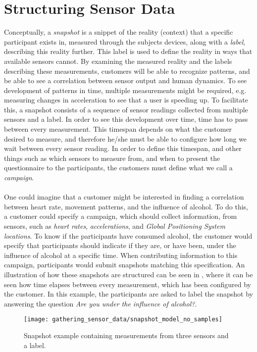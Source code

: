 
\section{Structuring Sensor Data}
\label{sec:modeling_sensor_data}


Conceptually, a \emph{snapshot} is a snippet of the reality (context) that a specific participant exists in, measured through the subjects devices, along with a \emph{label}, describing this reality further. This label is used to define the reality in ways that available sensors cannot. By examining the measured reality and the labels describing these measurements, customers will be able to recognize patterns, and be able to see a correlation between sensor output and human dynamics. To see development of patterns in time, multiple measurements might be required, e.g. measuring changes in acceleration to see that a user is speeding up. To facilitate this, a snapshot consists of a sequence of sensor readings collected from multiple sensors and a label. In order to see this development over time, time has to pass between every measurement. This timespan depends on what the customer desired to measure, and therefore he/she must be able to configure how long we wait between every sensor reading. In order to define this timespan, and other things such as which sensors to measure from, and when to present the questionnaire to the participants, the customers must define what we call a \emph{campaign}.
\\\\
One could imagine that a customer might be interested in finding a correlation between heart rate, movement patterns, and the influence of alcohol. To do this, a customer could specify a campaign, which should collect information, from sensors, such as \emph{heart rates}, \emph{accelerations}, and \emph{Global Positioning System locations}. To know if the participants have consumed alcohol, the customer would specify that participants should indicate if they are, or have been, under the influence of alcohol at a specific time. When contributing information to this campaign, participants would submit snapshots matching this specification. An illustration of how these snapshots are structured can be seen in , where it can be seen how time elapses between every measurement, which has been configured by the customer. In this example, the participants are asked to label the snapshot by answering the question \emph{Are you under the influence of alcohol?}.
\\
\begin{figure}[!htbp]
    \centering
    \texttt{[image: gathering\_sensor\_data/snapshot\_model\_no\_samples]}
    \caption{Snapshot example containing measurements from three sensors and a label.}
    \label{fig:snapshot_model_no_samples}
\end{figure}
\FloatBarrier


